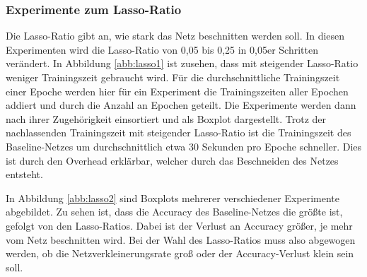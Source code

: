 \subsubsection{Experimente zum Lasso-Ratio}
Die Lasso-Ratio gibt an, wie stark das Netz beschnitten werden soll. In diesen Experimenten wird die Lasso-Ratio von 0,05 bis 0,25 in 0,05er Schritten verändert. In Abbildung \ref{abb:lasso1} ist zusehen, dass mit steigender Lasso-Ratio weniger Trainingszeit gebraucht wird. Für die durchschnittliche Trainingszeit einer Epoche werden hier für ein Experiment die Trainingszeiten aller Epochen addiert und durch die Anzahl an Epochen geteilt. Die Experimente werden dann nach ihrer Zugehörigkeit einsortiert und als Boxplot dargestellt. Trotz der nachlassenden Trainingszeit mit steigender Lasso-Ratio ist die Trainingszeit des Baseline-Netzes um durchschnittlich etwa 30 Sekunden pro Epoche schneller. Dies ist durch den Overhead erklärbar, welcher durch das Beschneiden des Netzes entsteht.


In Abbildung \ref{abb:lasso2} sind Boxplots mehrerer verschiedener Experimente abgebildet. Zu sehen ist, dass die Accuracy des Baseline-Netzes die größte ist, gefolgt von den Lasso-Ratios. Dabei ist der Verlust an Accuracy größer, je mehr vom Netz beschnitten wird. Bei der Wahl des Lasso-Ratios muss also abgewogen werden, ob die Netzverkleinerungsrate groß oder der Accuracy-Verlust klein sein soll.

